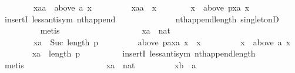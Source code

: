 \begin{isabellebody}
\ \ \ \ \ \ \ \ {\isachardoublequoteopen}xaa\ {\isasymin}\ above\ a\ x{\isachardoublequoteclose}\ \isanewline
\ \ \ \ \ \ \ \ {\isachardoublequoteopen}xaa\ {\isasymnoteq}\ x{\isachardoublequoteclose}\isanewline
\ \ \ \ \ \ \isamarkupfalse%
\ {\isachardoublequoteopen}x\ {\isasymin}\ above\ {\isacharparenleft}{\kern0pt}p{\isacharbang}{\kern0pt}xa{\isacharparenright}{\kern0pt}\ x{\isachardoublequoteclose}\isanewline
\ \ \ \ \ \ \ \ \isamarkupfalse%
\ insertI{}\ less{\isacharunderscore}{\kern0pt}antisym\ nth{\isacharunderscore}{\kern0pt}append\isanewline
\ \ \ \ \ \ \ \ \ \ \ \ \ \ nth{\isacharunderscore}{\kern0pt}append{\isacharunderscore}{\kern0pt}length\ singletonD\isanewline
\ \ \ \ \ \ \ \ \isamarkupfalse%
\ metis\isanewline
\ \ \ \ \isamarkupfalse%
\isanewline
\ \ \ \ \ \ \isamarkupfalse%
\isanewline
\ \ \ \ \ \ \ \ xa\ {\isacharcolon}{\kern0pt}{\isacharcolon}{\kern0pt}\ nat\isanewline
\ \ \ \ \ \ \isamarkupfalse%
\isanewline
\ \ \ \ \ \ \ \ {\isachardoublequoteopen}xa\ {\isacharless}{\kern0pt}\ Suc\ {\isacharparenleft}{\kern0pt}length\ p{\isacharparenright}{\kern0pt}{\isachardoublequoteclose}\ \isanewline
\ \ \ \ \ \ \ \ {\isachardoublequoteopen}above\ {\isacharparenleft}{\kern0pt}{\isacharparenleft}{\kern0pt}p{\isacharat}{\kern0pt}{\isacharbrackleft}{\kern0pt}a{\isacharbrackright}{\kern0pt}{\isacharparenright}{\kern0pt}{\isacharbang}{\kern0pt}xa{\isacharparenright}{\kern0pt}\ x\ {\isacharequal}{\kern0pt}\ {\isacharbraceleft}{\kern0pt}x{\isacharbraceright}{\kern0pt}{\isachardoublequoteclose}\ \isanewline
\ \ \ \ \ \ \ \ {\isachardoublequoteopen}x\ {\isasymnotin}\ above\ a\ x{\isachardoublequoteclose}\isanewline
\ \ \ \ \ \ \isamarkupfalse%
\ {\isachardoublequoteopen}xa\ {\isacharless}{\kern0pt}\ length\ p{\isachardoublequoteclose}\isanewline
\ \ \ \ \ \ \ \ \isamarkupfalse%
\ insertI{}\ less{\isacharunderscore}{\kern0pt}antisym\ nth{\isacharunderscore}{\kern0pt}append{\isacharunderscore}{\kern0pt}length\isanewline
\ \ \ \ \ \ \ \ \isamarkupfalse%
\ metis\isanewline
\ \ \ \ \isamarkupfalse%
\isanewline
\ \ \ \ \ \ \isamarkupfalse%
\isanewline
\ \ \ \ \ \ \ \ xa\ {\isacharcolon}{\kern0pt}{\isacharcolon}{\kern0pt}\ nat\ \isanewline
\ \ \ \ \ \ \ \ xb\ {\isacharcolon}{\kern0pt}{\isacharcolon}{\kern0pt}\ {\isachardoublequoteopen}{\isacharprime}{\kern0pt}a{\isachardoublequoteclose}\isanewline

\end{isabellebody}
